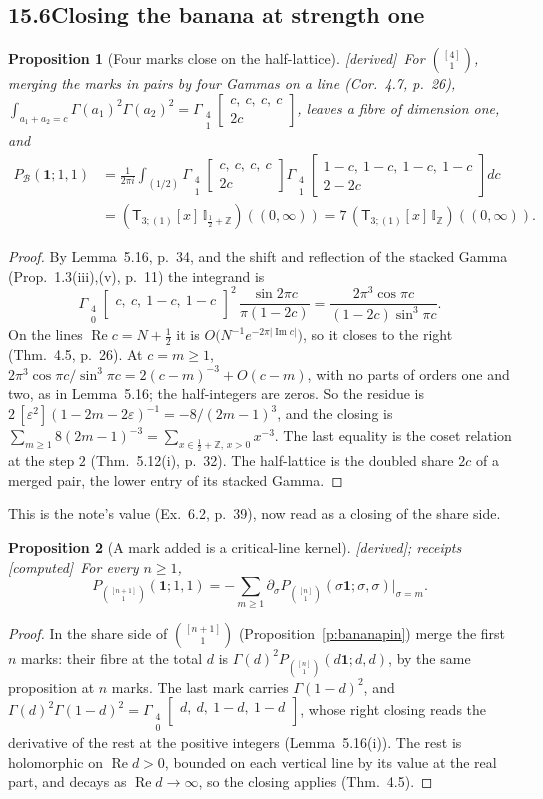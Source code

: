 \documentclass[11pt]{article}
\newcommand{\cB}{\mathcal B}
\newcommand{\one}{\mathbf 1}
\newcommand{\sT}{\mathsf T}
\newcommand{\Gst}[4]{\Gamma_{\substack{#1\\#2}}\!\begin{bmatrix}#3\\#4\end{bmatrix}}
\newcommand{\IZ}{\mathbb I_{\mathbb Z}}
\newcommand{\Ilat}[1]{\mathbb I_{#1}}
\newcommand{\Tx}[3]{(\sT_{#1;(1)}[x]\,#2)((#3,\infty))}
\DeclareMathOperator{\re}{Re}
\DeclareMathOperator{\im}{Im}
\theoremstyle{plain}
\newtheorem{proposition}{Proposition}[section]
\theoremstyle{definition}
\theoremstyle{remark}
\newcommand{\derived}{\textup{[derived]}}
\newcommand{\computed}{\textup{[computed]}}
\begin{document}
\subsection*{15.6\quad Closing the banana at strength one}

\begin{proposition}[Four marks close on the half-lattice]\label{p:fourclose}\derived\
For $\binom{[4]}1$, merging the marks in pairs by four Gammas on a line (Cor.~4.7, p.~26), $\int_{a_1+a_2=c}\Gamma(a_1)^2\Gamma(a_2)^2=\Gst41{c,\ c,\ c,\ c}{2c}$, leaves a fibre of dimension one, and
\begin{align*}
P_{\cB}(\one;1,1)&=\frac1{2\pi i}\int_{(1/2)}\Gst41{c,\ c,\ c,\ c}{2c}\Gst41{1-c,\ 1-c,\ 1-c,\ 1-c}{2-2c}dc\\
&=\Tx{3}{\Ilat{\frac12+\mathbb Z}}{0}=7\,\Tx{3}{\IZ}{0}.
\end{align*}
\end{proposition}

\begin{proof}
By Lemma~5.16, p.~34, and the shift and reflection of the stacked Gamma (Prop.~1.3(iii),(v), p.~11) the integrand is
\[
\Gst40{c,\ c,\ 1-c,\ 1-c}{}^2\,\frac{\sin2\pi c}{\pi(1-2c)}=\frac{2\pi^3\cos\pi c}{(1-2c)\sin^3\pi c}.
\]
On the lines $\re c=N+\frac12$ it is $O\big(N^{-1}e^{-2\pi|\im c|}\big)$, so it closes to the right (Thm.~4.5, p.~26). At $c=m\ge1$, $2\pi^3\cos\pi c/\sin^3\pi c=2(c-m)^{-3}+O(c-m)$, with no parts of orders one and two, as in Lemma~5.16; the half-integers are zeros. So the residue is $2\,[\varepsilon^2](1-2m-2\varepsilon)^{-1}=-8/(2m-1)^3$, and the closing is $\sum_{m\ge1}8(2m-1)^{-3}=\sum_{x\in\frac12+\mathbb Z,\,x>0}x^{-3}$. The last equality is the coset relation at the step $2$ (Thm.~5.12(i), p.~32). The half-lattice is the doubled share $2c$ of a merged pair, the lower entry of its stacked Gamma.
\end{proof}

\noindent This is the note's value (Ex.~6.2, p.~39), now read as a closing of the share side.

\begin{proposition}[A mark added is a critical-line kernel]\label{p:addmark}\derived; receipts \computed\
For every $n\ge1$,
\[
P_{\binom{[n+1]}1}(\one;1,1)=-\sum_{m\ge1}\partial_\sigma P_{\binom{[n]}1}(\sigma\one;\sigma,\sigma)\big|_{\sigma=m}.
\]
\end{proposition}

\begin{proof}
In the share side of $\binom{[n+1]}1$ (Proposition~\ref{p:bananapin}) merge the first $n$ marks: their fibre at the total $d$ is $\Gamma(d)^2P_{\binom{[n]}1}(d\one;d,d)$, by the same proposition at $n$ marks. The last mark carries $\Gamma(1-d)^2$, and $\Gamma(d)^2\Gamma(1-d)^2=\Gst40{d,\ d,\ 1-d,\ 1-d}{}$, whose right closing reads the derivative of the rest at the positive integers (Lemma~5.16(i)). The rest is holomorphic on $\re d>0$, bounded on each vertical line by its value at the real part, and decays as $\re d\to\infty$, so the closing applies (Thm.~4.5).
\end{proof}
\end{document}
